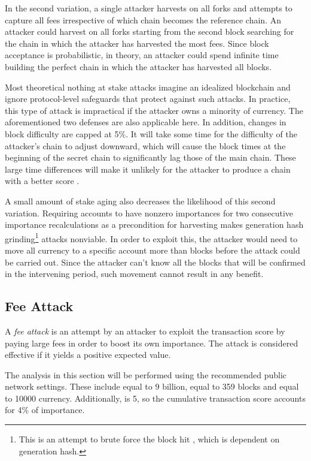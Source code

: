 In the second variation, a single attacker harvests on all forks and attempts to capture all fees irrespective of which chain becomes the reference chain.
An attacker could harvest on all forks starting from the second block searching for the chain in which the attacker has harvested the most fees.
Since block acceptance is probabilistic, in theory, an attacker could spend infinite time building the perfect chain in which the attacker has harvested all blocks.

Most theoretical nothing at stake attacks imagine an idealized blockchain and ignore protocol-level safeguards that protect against such attacks.
In practice, this type of attack is impractical if the attacker owns a minority of currency.
The aforementioned two defenses are also applicable here.
In addition, changes in block difficulty  are capped at 5\%.
It will take some time for the difficulty of the attacker's chain to adjust downward, which will cause the block times at the beginning of the secret chain to significantly lag those of the main chain.
These large time differences will make it unlikely for the attacker to produce a chain with a better score .

A small amount of stake aging also decreases the likelihood of this second variation.
Requiring accounts to have nonzero importances for two consecutive importance recalculations as a precondition for harvesting makes generation hash grinding\footnote{This is an attempt to brute force the block hit , which is dependent on generation hash.} attacks nonviable.
In order to exploit this, the attacker would need to move all currency to a specific account more than  blocks before the attack could be carried out.
Since the attacker can't know all the blocks that will be confirmed in the intervening period, such movement cannot result in any benefit.

\subsection{Fee Attack}
\label{sec:consensus:feeAttack}

A \emph{fee attack} is an attempt by an attacker to exploit the transaction score by paying large fees in order to boost its own importance.
The attack is considered effective if it yields a positive expected value.

The analysis in this section will be performed using the recommended public network settings.
These include  equal to 9 billion,  equal to 359 blocks and  equal to 10000 currency.
Additionally,  is 5, so the cumulative transaction score  accounts for 4\% of importance.

